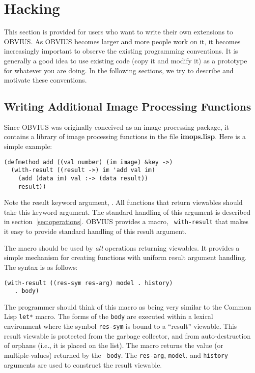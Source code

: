 \section{Hacking}
\label{sec:hacking}

This section is provided for users who want to write their own
extensions to OBVIUS.  As OBVIUS becomes larger and more people work
on it, it becomes increasingly important to observe the existing
programming conventions.  It is generally a good idea to use existing
code (copy it and modify it) as a prototype for whatever you are
doing.  In the following sections, we try to describe and motivate
these conventions.

\subsection{Writing Additional Image Processing Functions}
\label{sec:writing-ops}

Since OBVIUS was originally conceived as an image processing package,
it contains a library of image processing functions in the file {\bf
imops.lisp}.  Here is a simple example:
\begin{tt} \begin{verbatim}
(defmethod add ((val number) (im image) &key ->)
  (with-result ((result ->) im 'add val im)
    (add (data im) val :-> (data result))
    result))
\end{verbatim} \end{tt}
Note the result keyword argument, \lsym{:->}.  All functions that
return viewables should take this keyword argument.  The standard
handling of this argument is described in
section~\ref{sec:operations}.  OBVIUS provides a macro, {\tt
with-result} that makes it easy to provide standard handling of this
result argument.

The  macro should be used by {\em all} operations
returning viewables.  It provides a simple mechanism for creating
functions with uniform result argument handling.  The syntax is as
follows: 
\begin{verbatim}
(with-result ((res-sym res-arg) model . history)
   . body)
\end{verbatim}
The programmer should think of this macro as being very similar to the
Common Lisp {\tt let*} macro.  The forms of the {\tt body} are
executed within a lexical environment where the symbol {\tt res-sym}
is bound to a ``result'' viewable.  This result viewable is protected
from the garbage collector, and from auto-destruction of orphans
(i.e., it is placed on the  list).  The
macro returns the value (or multiple-values) returned by the {\tt
body}.  The {\tt res-arg}, {\tt model}, and {\tt history} arguments
are used to construct the result viewable.

